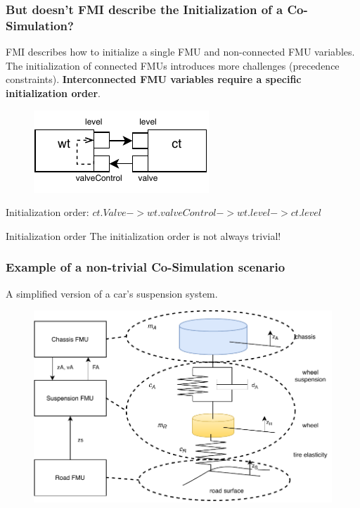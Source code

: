 \documentclass{beamer}
\begin{document}
\begin{frame}
\frametitle{But doesn't FMI describe the Initialization of a Co-Simulation?}
FMI describes how to initialize a single FMU and non-connected FMU variables.
The initialization of connected FMUs introduces more challenges (precedence constraints).
\textbf{Interconnected FMU variables require a specific initialization order}.

\begin{figure}
    \centering
    \includegraphics[scale=1.5]{images/ExpansionPlugin-Page-3.pdf}
\end{figure}
Initialization order: $ct.Valve -> wt.valveControl -> wt.level -> ct.level$
\begin{alertblock}{Initialization order} 
    The initialization order is not always trivial! 
\end{alertblock}
\end{frame}

\begin{frame}
\frametitle{Example of a non-trivial Co-Simulation scenario}
A simplified version of a car's suspension system.
\begin{figure}
    \centering
    \includegraphics[scale=0.6]{images/quarter_car.pdf}
    \label{fig:SCC_quarter}
\end{figure}
\end{frame}
\end{document}
